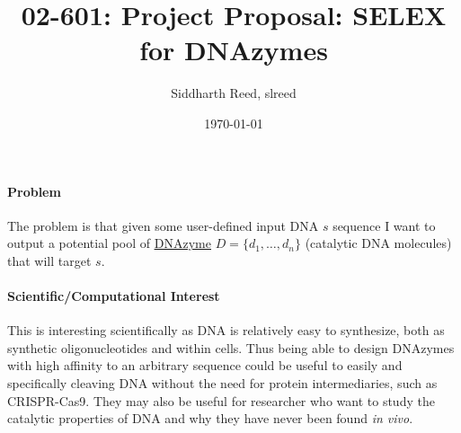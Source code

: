 \documentclass[11pt]{article}
\newcommand{\link}[2]{\href{#1}{\color{linkcolor}\setulcolor{linkcolor}\ul{\mbox{#2}}}}
\begin{document}
\title{02-601: Project Proposal: SELEX for DNAzymes}
\author{Siddharth Reed, slreed}
\date{\today}
\maketitle

\paragraph{\textbf{Problem}}
The problem is that given some user-defined input DNA $s$ sequence I want to output a potential pool of \link{https://en.wikipedia.org/wiki/Deoxyribozyme}{DNAzyme} $D=\{d_1,\ldots,d_n\}$ (catalytic DNA molecules) that will target $s$.
\par
\paragraph{\textbf{Scientific/Computational Interest}}
This is interesting scientifically as DNA is relatively easy to synthesize, both as synthetic oligonucleotides and within cells.
Thus being able to design DNAzymes with high affinity to an arbitrary sequence could be useful to easily and specifically cleaving DNA without the need for protein intermediaries, such as CRISPR-Cas9.
They may also be useful for researcher who want to study the catalytic properties of DNA and why they have never been found \textit{in vivo}.
\end{document}
